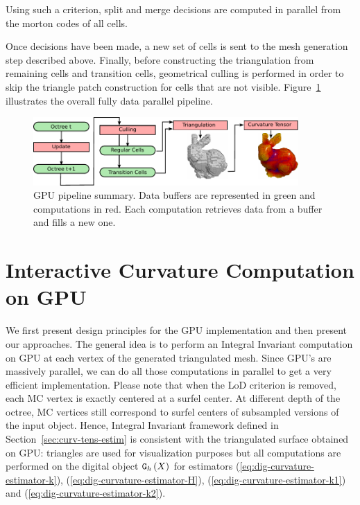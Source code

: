 \documentclass{llncs}
\begin{document}
%
Using such a criterion, split and merge decisions are computed in
parallel from the morton codes of all cells.

Once decisions have been made, a new set of cells is sent to the mesh
generation step described above.
Finally, before
constructing the triangulation from remaining cells and transition
cells, geometrical culling is performed in order to skip the triangle
patch construction for cells that are not visible. Figure~\ref{fig_pipeline}
illustrates the overall fully data parallel pipeline.

\begin{figure}[!htbp]
  \centering
  \includegraphics[width=0.9\textwidth]{figs/pipeline2}
  \caption{GPU pipeline summary. Data buffers are
    represented in green and computations in red. Each computation
    retrieves data from a buffer and fills a new one. }
  \label{fig_pipeline}
\end{figure}

\section{Interactive Curvature Computation on GPU}
\label{sec:inter-visu-gpu}

We first present design principles for the GPU implementation and then
present our approaches.
The general idea is to perform an Integral Invariant computation on
GPU at each vertex of the generated triangulated mesh.
\color{blue}
Since GPU's are massively parallel, we can do all those computations in parallel 
to get a very efficient implementation. Please note that
\normalcolor
when the LoD criterion is removed, each MC vertex is exactly centered at
a surfel center. At different depth of the octree, MC vertices still
correspond to surfel centers of subsampled versions of the input
object. Hence, Integral Invariant framework defined in
Section~\ref{sec:curv-tens-estim} is consistent with the triangulated
surface obtained on GPU: triangles are used for visualization purposes
but all computations are performed on the digital object $\mathtt{G}_{h}\left(X\right)$ for
estimators
(\ref{eq:dig-curvature-estimator-k}),
(\ref{eq:dig-curvature-estimator-H}), (\ref{eq:dig-curvature-estimator-k1})
and (\ref{eq:dig-curvature-estimator-k2}).
\end{document}
